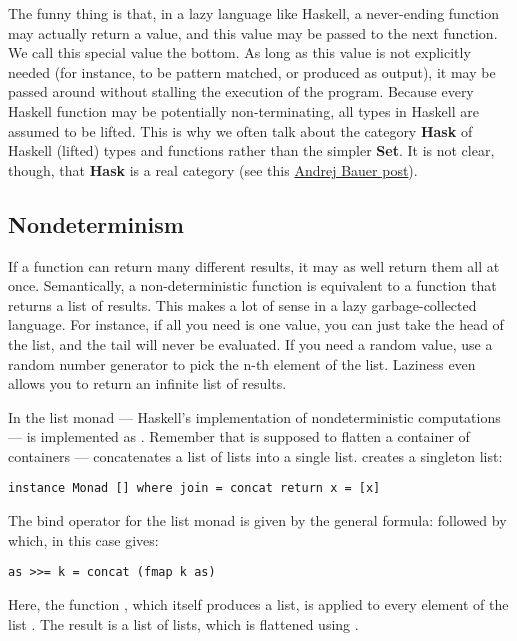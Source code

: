 The funny thing is that, in a lazy language like Haskell, a never-ending
function may actually return a value, and this value may be passed to
the next function. We call this special value the bottom. As long as
this value is not explicitly needed (for instance, to be pattern
matched, or produced as output), it may be passed around without
stalling the execution of the program. Because every Haskell function
may be potentially non-terminating, all types in Haskell are assumed to
be lifted. This is why we often talk about the category \textbf{Hask} of
Haskell (lifted) types and functions rather than the simpler
\textbf{Set}. It is not clear, though, that \textbf{Hask} is a real
category (see this
\href{http://math.andrej.com/2016/08/06/hask-is-not-a-category/}{Andrej
Bauer post}).

\subsection{Nondeterminism}\label{nondeterminism}

If a function can return many different results, it may as well return
them all at once. Semantically, a non-deterministic function is
equivalent to a function that returns a list of results. This makes a
lot of sense in a lazy garbage-collected language. For instance, if all
you need is one value, you can just take the head of the list, and the
tail will never be evaluated. If you need a random value, use a random
number generator to pick the n-th element of the list. Laziness even
allows you to return an infinite list of results.

In the list monad --- Haskell's implementation of nondeterministic
computations ---  is implemented as .
Remember that  is supposed to flatten a container of
containers ---  concatenates a list of lists into a
single list.  creates a singleton list:

\begin{verbatim}
instance Monad [] where join = concat return x = [x]
\end{verbatim}

The bind operator for the list monad is given by the general formula:
 followed by  which, in this case gives:

\begin{verbatim}
as >>= k = concat (fmap k as)
\end{verbatim}

Here, the function , which itself produces a list, is applied
to every element of the list . The result is a list of lists,
which is flattened using .


